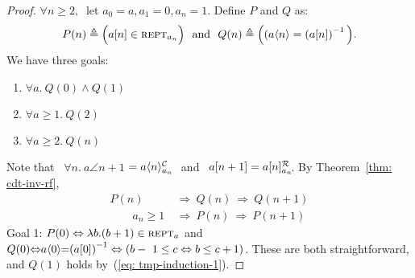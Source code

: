 \begin{proof}
$\forall n \ge 2,~$ let $a_0 = a, a_1 = 0, a_n = 1$. Define $P$ and $Q$ as:
\begin{equation*}
P(n) \triangleq  \Big(a[n] \in \text{\scshape{rept}}_{a_n}\Big)\ \text{ and } \
Q(n) \triangleq  \Big((a\langle n\rangle = \left(a[n]\right)^{-1} \Big).
\end{equation*}
We have three goals:
\begin{enumerate}
	\item $\forall a.~ Q(0) \wedge Q(1)$ \\ \vspace{-1.2em}
	\item $\forall a \ge 1.~ Q(2)$ \\ \vspace{-1.2em}
	\item $\forall a \ge 2.~ Q(n)$ \\ \vspace{-1.2em}
\end{enumerate}
	Note that \ \mbox{$\forall n.~ a\angle{n+1}$} $= \cdt{a\angle{n}}{a_n}$ ~and \ $a[n+1] = \rf{a[n]}{a_n}$. By Theorem~\ref{thm: cdt-inv-rf},
	\begin{align}
	P(n) & \ \Rightarrow \ Q(n) \ \Rightarrow \ Q(n+1) \label{eq: tmp-induction-1} \\
	\qquad a_{n} \ge 1 & \ \Rightarrow \ P(n) \ \Rightarrow \ P(n+1) \label{eq: tmp-induction-2}
	\end{align}
Goal 1: $P(0) \Leftrightarrow \lambda b.(b+1)\in \text{\scshape{rept}}_a$ and
$Q(0)\hspace{-0.3em}\iff\hspace{-0.3em}a\angle{0}\hspace{-0.3em}=\hspace{-0.3em}\left(a[0]\right)^{-1} \lb \iff (b-~1\le c \iff b\le c+1)$.
These are both straightforward, and $Q(1)$ holds by~(\ref{eq: tmp-induction-1}).

\end{proof}
